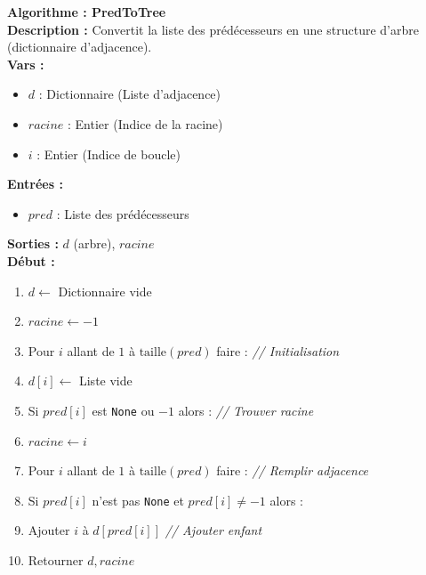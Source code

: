 \documentclass[a4paper, 12pt]{article}
\begin{document}
\begin{tcolorbox}[colback=darkWhite!75!white,colframe=black!30,left=5pt,right=5pt,top=5pt,bottom=5pt]
\textbf{Algorithme : PredToTree} \\
\textbf{Description :} Convertit la liste des prédécesseurs en une structure d'arbre (dictionnaire d'adjacence). \\
\textbf{Vars :}
\begin{itemize}
    \item $d$ : Dictionnaire (Liste d'adjacence)
    \item $racine$ : Entier (Indice de la racine)
    \item $i$ : Entier (Indice de boucle)
\end{itemize}
\textbf{Entrées :}
\begin{itemize}
    \item $pred$ : Liste des prédécesseurs
\end{itemize}
\textbf{Sorties :} $d$ (arbre), $racine$ \\
\textbf{Début :}
\begin{enumerate}
    \item $d \leftarrow$ Dictionnaire vide
    \item $racine \leftarrow -1$
    \item Pour $i$ allant de $1$ à $\text{taille}(pred)$ faire : \textit{// Initialisation}
    \item \quad $d[i] \leftarrow$ Liste vide
    \item \quad Si $pred[i]$ est \texttt{None} ou $-1$ alors : \textit{// Trouver racine}
    \item \quad \quad $racine \leftarrow i$
    \item Pour $i$ allant de $1$ à $\text{taille}(pred)$ faire : \textit{// Remplir adjacence}
    \item \quad Si $pred[i]$ n'est pas \texttt{None} et $pred[i] \neq -1$ alors :
    \item \quad \quad Ajouter $i$ à $d[pred[i]]$ \textit{// Ajouter enfant}
    \item Retourner $d, racine$
\end{enumerate}
\end{tcolorbox}

\vspace{5mm}
\end{document}
